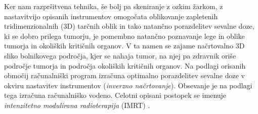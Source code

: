 \documentclass[a4paper,twoside,11pt]{article}
\begin{document}
	\par{
	  Ker nam razpršitvena tehnika, še bolj pa skeniranje z ozkim žarkom, z nastavitvijo opisanih instrumentov omogočata oblikovanje zapletenih tridimenzionalnih (3D) tarčnih oblik in tako natančno porazdelitev sevalne doze, ki se dobro prilega tumorju, je pomembno natančno poznavanje lege in oblike tumorja in okoliških kritičnih organov. V ta namen se zajame načrtovalno 3D sliko bolnikovega področja, kjer se nahaja tumor, na njej pa zdravnik oriše področje tumorja in področja okoliških kritičnih organov. Na podlagi orisanih območij računalniški program izračuna optimalno porazdelitev sevalne doze v okviru nastavitev instrumentov (\emph{inverzno načrtovanje}). Obsevanje je na podlagi tega izračuna računalniško vodeno. Celotni opisani postopek se imenuje \emph{intenzitetno modulirana radioterapija} (IMRT) \citep{jaffray2012}.
	}
\end{document}
